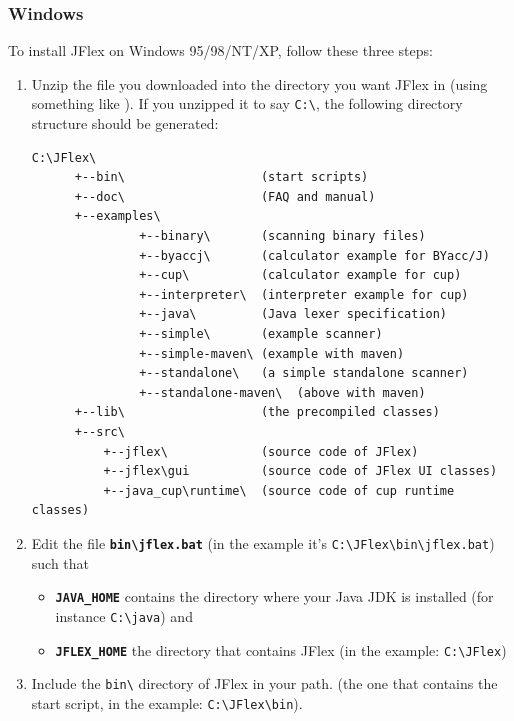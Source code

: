 \documentclass[11pt]{scrartcl}
\newcommand{\xsmall}{}
\begin{document}
\subsubsection{Windows\label{install:windows}}
To install JFlex on Windows 95/98/NT/XP, follow these three steps:
\begin{enumerate}
\item
Unzip the file you downloaded into the directory you want JFlex in (using
something like 
).
If you unzipped it to say \verb+C:\+, the following directory structure
should be generated:
{\xsmall
\begin{verbatim}
C:\JFlex\                          
      +--bin\                   (start scripts) 
      +--doc\                   (FAQ and manual)
      +--examples\ 
               +--binary\       (scanning binary files)
               +--byaccj\       (calculator example for BYacc/J)
               +--cup\          (calculator example for cup)
               +--interpreter\  (interpreter example for cup)
               +--java\         (Java lexer specification) 
               +--simple\       (example scanner)
               +--simple-maven\ (example with maven)
               +--standalone\   (a simple standalone scanner)
               +--standalone-maven\  (above with maven)
      +--lib\                   (the precompiled classes) 
      +--src\ 
          +--jflex\             (source code of JFlex) 
          +--jflex\gui          (source code of JFlex UI classes)
          +--java_cup\runtime\  (source code of cup runtime classes) 
\end{verbatim}
}

\item
Edit the file {\bf \verb+bin\jflex.bat+}
(in the example it's \verb+C:\JFlex\bin\jflex.bat+)
such that

\begin{itemize}
\item
  {\bf \texttt{JAVA\_HOME}} contains the directory where your Java JDK is installed
  (for instance \verb+C:\java+) and
\item
  {\bf \texttt{JFLEX\_HOME}} the directory that contains JFlex (in the example:
  \verb+C:\JFlex+) 
\end{itemize}
 
\item
Include the \verb+bin\+ directory of JFlex in your path.
(the one that contains the start script, in the example: \verb+C:\JFlex\bin+).
\end{enumerate}
\end{document}
